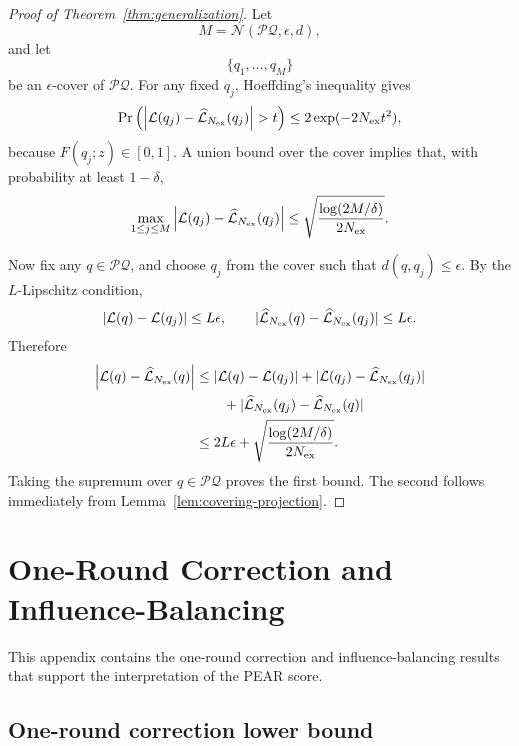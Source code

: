 \begin{proof}[Proof of Theorem~\ref{thm:generalization}]
    
Let
\[
    M=\mathcal N(\mathcal P\mathcal Q,\epsilon,d),
\]
and let
\[
    \{q_1,\ldots,q_M\}
\]
be an $\epsilon$-cover of $\mathcal P\mathcal Q$. For any fixed $q_j$,
Hoeffding's inequality gives
\[
    \Pr\left(
    \left|
    \mathcal L(q_j)-\widehat{\mathcal L}_{N_{\rm ex}}(q_j)
    \right|
    >
    t
    \right)
    \le
    2\exp(-2N_{\rm ex}t^2),
\]
because $F(q_j;z)\in[0,1]$. A union bound over the cover implies that, with
probability at least $1-\delta$,
\[
    \max_{1\le j\le M}
    \left|
    \mathcal L(q_j)-\widehat{\mathcal L}_{N_{\rm ex}}(q_j)
    \right|
    \le
    \sqrt{
    \frac{
    \log(2M/\delta)
    }{
    2N_{\rm ex}
    }}
    .
\]

Now fix any $q\in\mathcal P\mathcal Q$, and choose $q_j$ from the cover such
that $d(q,q_j)\le\epsilon$. By the $L$-Lipschitz condition,
\[
    |\mathcal L(q)-\mathcal L(q_j)|\le L\epsilon,
    \qquad
    |\widehat{\mathcal L}_{N_{\rm ex}}(q)
    -
    \widehat{\mathcal L}_{N_{\rm ex}}(q_j)|
    \le L\epsilon.
\]
Therefore
\[
\begin{aligned}
    \left|
    \mathcal L(q)-\widehat{\mathcal L}_{N_{\rm ex}}(q)
    \right|
    &\le
    |\mathcal L(q)-\mathcal L(q_j)|
    +
    |\mathcal L(q_j)-\widehat{\mathcal L}_{N_{\rm ex}}(q_j)|\\
    &\qquad
    +
    |\widehat{\mathcal L}_{N_{\rm ex}}(q_j)
    -
    \widehat{\mathcal L}_{N_{\rm ex}}(q)|\\
    &\le
    2L\epsilon
    +
    \sqrt{
    \frac{
    \log(2M/\delta)
    }{
    2N_{\rm ex}
    }}
    .
\end{aligned}
\]
Taking the supremum over $q\in\mathcal P\mathcal Q$ proves the first bound.
The second follows immediately from Lemma~\ref{lem:covering-projection}.
\end{proof}


\section{One-Round Correction and Influence-Balancing}
\label{app:deferred-theory}

This appendix contains the one-round correction and influence-balancing results that support the interpretation of the PEAR score. %

\subsection{One-round correction lower bound}

